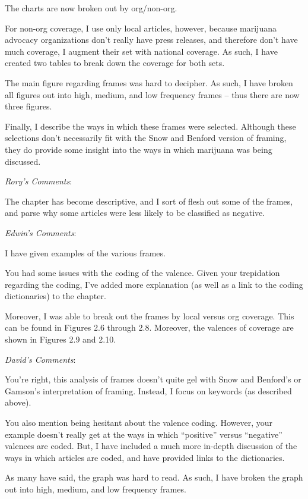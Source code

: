 \documentclass[12pt,stdletter,dateno,sigleft]{newlfm} %
\begin{document}
\begin{newlfm}
The charts are now broken out by org/non-org. 

For non-org coverage, I use only local articles, however, because marijuana advocacy organizations don't really have press releases, and therefore don't have much coverage, I augment their set with national coverage. As such, I have created two tables to break down the coverage for both sets. 

The main figure regarding frames was hard to decipher. As such, I have broken all figures out into high, medium, and low frequency frames -- thus there are now three figures. 

Finally, I describe the ways in which these frames were selected. Although these selections don't necessarily fit with the Snow and Benford version of framing, they do provide some insight into the ways in which marijuana was being discussed. \newline


\textit{Rory's Comments}:

The chapter has become descriptive, and I sort of flesh out some of the frames, and parse why some articles were less likely to be classified as negative. \newline

\textit{Edwin's Comments}:

I have given examples of the various frames. 

You had some issues with the coding of the valence. Given your trepidation regarding the coding, I've added more explanation (as well as a link to the coding dictionaries) to the chapter. 

Moreover, I was able to break out the frames by local versus org coverage. This can be found in Figures 2.6 through 2.8. Moreover, the valences of coverage are shown in Figures 2.9 and 2.10. \newline

\textit{David's Comments}:

You're right, this analysis of frames doesn't quite gel with Snow and Benford's or Gamson's interpretation of framing. Instead, I focus on keywords (as described above). 

You also mention being hesitant about the valence coding. However, your example doesn't really get at the ways in which ``positive'' versus ``negative'' valences are coded. But, I have included a much more in-depth discussion of the ways in which articles are coded, and have provided links to the dictionaries. 

As many have said, the graph was hard to read. As such, I have broken the graph out into high, medium, and low frequency frames.



\end{newlfm}
\end{document}
